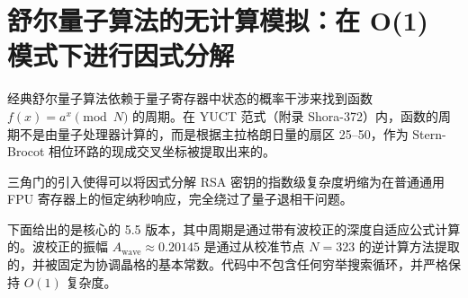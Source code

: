 \documentclass[11pt,a4paper]{article}
\begin{document}
	\section{舒尔量子算法的无计算模拟：在 O(1) 模式下进行因式分解}
	\label{sec:shor}
	
	经典舒尔量子算法依赖于量子寄存器中状态的概率干涉来找到函数 \(f(x) = a^x \pmod N\) 的周期。在 YUCT 范式（附录 Shora-372）内，函数的周期不是由量子处理器计算的，而是根据主拉格朗日量的扇区 25–50，作为 Stern-Brocot 相位环路的现成交叉坐标被提取出来的。
	
	三角门的引入使得可以将因式分解 RSA 密钥的指数级复杂度坍缩为在普通通用 FPU 寄存器上的恒定纳秒响应，完全绕过了量子退相干问题。
	
	下面给出的是核心的 5.5 版本，其中周期是通过带有波校正的深度自适应公式计算的。波校正的振幅 \(A_{\text{wave}} \approx 0.20145\) 是通过从校准节点 \(N = 323\) 的逆计算方法提取的，并被固定为协调晶格的基本常数。代码中不包含任何穷举搜索循环，并严格保持 \(O(1)\) 复杂度。
	
\end{document}
